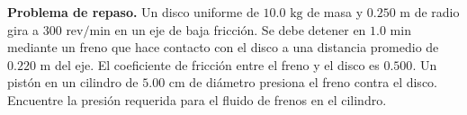 \item \textbf{Problema de repaso.} Un disco uniforme de $10.0 \text{ kg}$ de masa y $0.250 \text{ m}$ de radio gira a $300 \text{ rev/min}$ en un eje de baja fricción. Se debe detener en $1.0 \text{ min}$ mediante un freno que hace contacto con el disco a una distancia promedio de $0.220 \text{ m}$ del eje. El coeficiente de fricción entre el freno y el disco es $0.500$. Un pistón en un cilindro de $5.00 \text{ cm}$ de diámetro presiona el freno contra el disco. Encuentre la presión requerida para el fluido de frenos en el cilindro.
